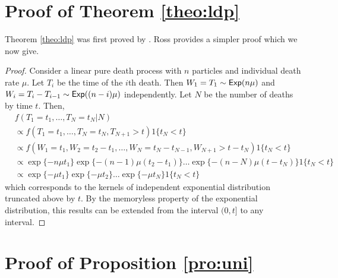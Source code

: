 \documentclass[11pt]{article}
\begin{document}
	\appendix
	
	\section{Proof of Theorem \ref{theo:ldp}}
	\label{app:ldp}
	
	Theorem \ref{theo:ldp} was first proved by \cite{Neuts.1971}. Ross \cite{Ross.1996} provides a simpler proof which we now give.
	
	\begin{proof}
	Consider a linear pure death process with $n$ particles and individual death rate $\mu$.
	Let $T_i$ be the time of the $i$th death. Then $W_1 = T_1 \sim \textsf{Exp}(n\mu)$ and $W_i = T_i - T_{i-1} \sim \textsf{Exp}((n-i)\mu)$ independently. Let $N$ be the number of deaths by time $t$. Then, 
	\begin{align*}
		& f(T_1 = t_1, \dots, T_N = t_N | N) \\
		& \propto f(T_1 = t_1, \dots, T_N = t_N, T_{N+1} > t) 1\{t_N < t\}\\
		& \propto f(W_1 = t_1, W_2 = t_2 - t_1, \dots, W_N = t_N - t_{N-1}, W_{N+1} > t - t_N) 1\{t_N < t\}\\
		& \propto \exp\{-n\mu t_1\} \exp\{-(n-1)\mu(t_2-t_1)\}\dots \exp\{-(n-N)\mu(t - t_N)\} 1\{t_N < t\}\\
		& \propto \exp\{-\mu t_1\}\exp\{-\mu t_2\} \dots \exp\{-\mu t_N\} 1\{t_N < t\}
	\end{align*}
	which corresponds to the kernels of independent exponential distribution truncated above by $t$. By the memoryless property of the exponential distribution, this results can be extended from the interval $(0, t]$ to any interval.
	
	\end{proof}
	
	\section{Proof of Proposition \ref{pro:uni}}
	\label{app:uni}
	
\end{document}

